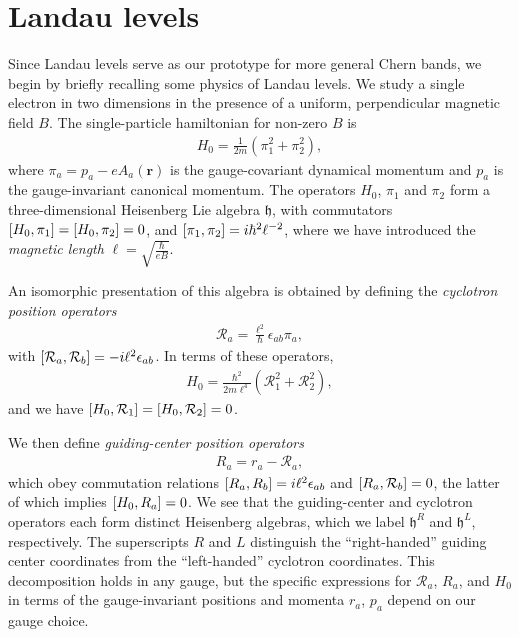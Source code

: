 \documentclass[aps,prb,twocolumn,letterpaper,twoside,nobalancelastpage,groupedaddress,amsmath,amssymb,floatfix,citeautoscript]{revtex4-1}
\begin{document}
\section{Landau levels}
\label{landau-level-review}
Since Landau levels serve as our prototype for more general Chern bands, we begin by briefly recalling some physics of Landau levels\cite{yoshioka_quantum_2002}. We study a single electron in two dimensions in the presence of a uniform, perpendicular magnetic field $B$. The single-particle hamiltonian for non-zero $B$ is
\begin{align*}
H_0 = \frac{1}{2m}\left(\pi_1^2 + \pi_2^2\right),
\end{align*}
where $\pi_a = p_a - e A_a(\mathbf{r})$ is the gauge-covariant dynamical momentum and $p_a$ is the gauge-invariant canonical momentum. The operators $H_0$, $\pi_1$ and $\pi_2$ form a three-dimensional Heisenberg Lie algebra $\mathfrak{h}$, with commutators $\comm{H_0}{\pi_1} = \comm{H_0}{\pi_2} = 0$, and $\comm{\pi_1}{\pi_2} = i\hbar^2\ell^{-2}$, where we have introduced the \textit{magnetic length} $\ell = \sqrt{\frac{\hbar}{eB}}.$

An isomorphic presentation of this algebra is obtained by defining the \textit{cyclotron position operators}
\begin{align*}
\mathcal{R}_a = \frac{\ell^2}{\hbar}\epsilon_{ab}\pi_a,
\end{align*}
with $\comm{\mathcal{R}_a}{\mathcal{R}_b} = -i\ell^2\epsilon_{ab}$. In terms of these operators, 
\begin{align*}
H_0 = \frac{\hbar^2}{2m\ell^4}\left(\mathcal{R}^2_1 + \mathcal{R}^2_2\right),
\end{align*}
and we have $\comm{H_0}{\mathcal{R}_1} = \comm{H_0}{\mathcal{R}_2} = 0$.

We then define \textit{guiding-center position operators}
\begin{align*}
R_a = r_a - \mathcal{R}_a,
\end{align*}
which obey commutation relations $\comm{R_a}{R_b} = i\ell^2 \epsilon_{ab}$ and $\comm{R_a}{\mathcal{R}_b} = 0$, the latter of which implies $\comm{H_0}{R_a} = 0$. We see that the guiding-center and cyclotron operators each form distinct Heisenberg algebras, which we label $\mathfrak{h}^{R}$ and $\mathfrak{h}^{L}$, respectively. The superscripts $R$ and $L$ distinguish the ``right-handed'' guiding center coordinates from the ``left-handed'' cyclotron coordinates. This decomposition holds in any gauge, but the specific expressions for $\mathcal{R}_a$, $R_a$, and $H_0$ in terms of the gauge-invariant positions and momenta $r_a$, $p_a$ depend on our gauge choice.
\end{document}

